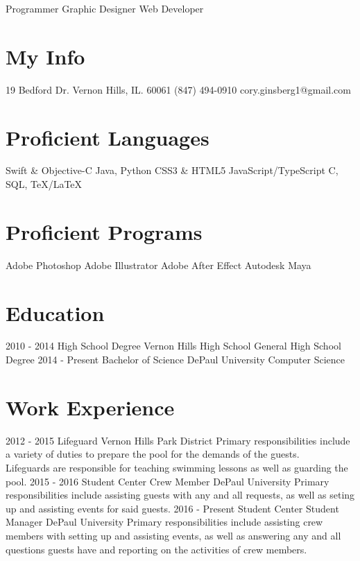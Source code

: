 \documentclass[]{resume-class}
\begin{document}
       {Programmer \textbullet \hspace{0.01cm} Graphic Designer \textbullet \hspace{0.01cm} Web Developer}


\begin{aside}
  \section{My Info}
    19 Bedford Dr.
    Vernon Hills, IL.
    60061
    (847) 494-0910
    cory.ginsberg1@gmail.com
  \section{Proficient Languages}
    Swift \& Objective-C
    Java, Python
    CSS3 \& HTML5
    JavaScript/TypeScript
    C, SQL, TeX/LaTeX
  \section{Proficient Programs}
    Adobe Photoshop
    Adobe Illustrator
    Adobe After Effect
    Autodesk Maya
\end{aside}

\section{Education}

\begin{entrylist}
  \entry
    {2010 - 2014}
    {High School Degree}
    {Vernon Hills High School}
    {General High School Degree}
  \entry
    {2014 - Present}
    {Bachelor of Science}
    {DePaul University}
    {Computer Science}
\end{entrylist}

\section{Work Experience}

\begin{entrylist}
  \entry
    {2012 - 2015}
    {Lifeguard}
    {Vernon Hills Park District}
    {Primary responsibilities include a variety of duties to prepare the pool for the demands of the guests.\\
Lifeguards are responsible for teaching swimming lessons as well as guarding the pool.}
  \entry
    {2015 - 2016}
    {Student Center Crew Member}
    {DePaul University}
    {Primary responsibilities include assisting guests with any and all requests, as well as seting up and assisting events for said guests.}
  \entry
    {2016 - Present}
    {Student Center Student Manager}
    {DePaul University}
    {Primary responsibilities include assisting crew members with setting up and assisting events, as well as answering any and all questions guests have and reporting on the activities of crew members.}
\end{entrylist}
\end{document}
